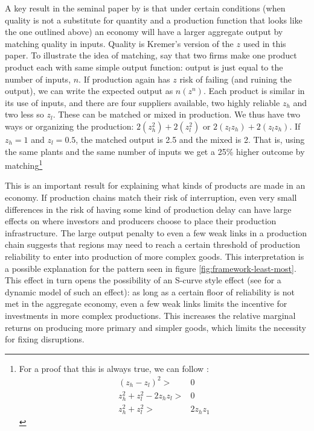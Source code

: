 \documentclass[11pt]{article}
\begin{document}
A key result in the seminal paper by \cite{kremer_o-ring_1993} is that under certain conditions (when quality is not a substitute for quantity and a production function that looks like the one outlined above) an economy will have a larger aggregate output by matching quality in inputs. Quality is Kremer's version of the \(z\) used in this paper. To illustrate the idea of matching, say that two firms make one product product each with same simple output function: output is just equal to the number of inputs, $n$. If production again has $z$ risk of failing (and ruining the output), we can write the expected output as $n(z^n)$. Each product is similar in its use of inputs, and there are four suppliers available, two highly reliable \(z_{h}\) and two less so \(z_{l}\). These can be matched or mixed in production. We thus have two ways or organizing the production: $2(z_h^2) + 2(z_l^2)$ or $2(z_l z_h) + 2(z_l z_h)$. If $z_h = 1$ and $z_l = 0.5$, the matched output is 2.5 and the mixed is 2. That is, using the same plants and the same number of inputs we get a 25\% higher outcome by matching\footnote{For a proof that this is always true, we can follow \cite{kremer_o-ring_1993}:
\begin{align*}
	(z_h - z_l)^2 >& 0 \\  z_h^2 + z_l^2 - 2z_h z_l >& 0 \\ z_h^2 + z_l^2 >& 2z_h z_1
\end{align*}}

  This is an important result for explaining what kinds of products are made in an economy. If production chains match their risk of interruption, even very small differences in the risk of having some kind of production delay can have large effects on where investors and producers choose to place their production infrastructure. The large output penalty to even a few weak links in a production chain suggests that regions may need to reach a certain threshold of production reliability to enter into production of more complex goods. This interpretation is a possible explanation for the pattern seen in figure \ref{fig:framework-least-most}. This effect in turn opens the possibility of an S-curve style effect (see \cite{brummitt_contagious_2017} for a dynamic model of such an effect): as long as a certain floor of reliability is not met in the aggregate economy, even a few weak links limits the incentive for investments in more complex productions. This increases the relative marginal returns on producing more primary and simpler goods, which limits the necessity for fixing disruptions.
\end{document}

